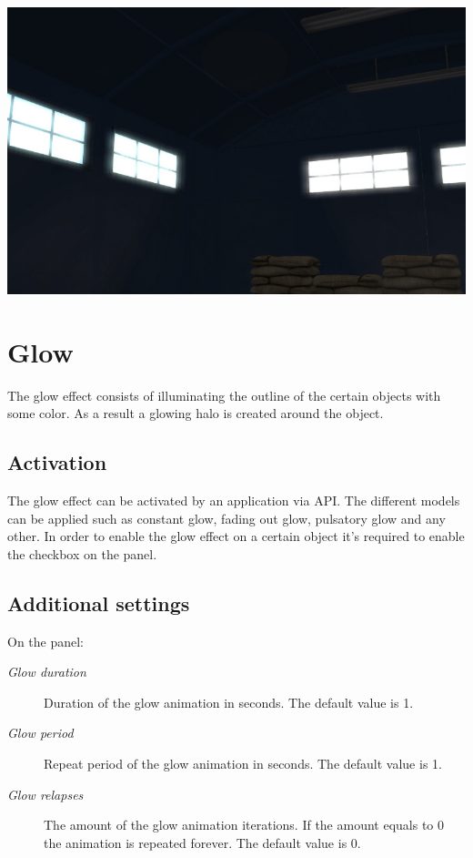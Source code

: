 \documentclass[a4paper,12pt,oneside]{sphinxmanual}
\begin{document}
{\hfill\includegraphics[width=1.000\linewidth]{bloom.jpg}\hfill}

\begin{DUlineblock}{0em}
\item[] 
\end{DUlineblock}


\section{Glow}
\label{postprocessing_effects:index-4}\label{postprocessing_effects:id17}\label{postprocessing_effects:glow}
The glow effect consists of illuminating the outline of the certain objects with some color. As a result a glowing halo is created around the object.


\subsection{Activation}
\label{postprocessing_effects:id18}
The glow effect can be activated by an application via API. The different models can be applied such as constant glow, fading out glow, pulsatory glow and any other. In order to enable the glow effect on a certain object it's required to enable the  checkbox on the  panel.


\subsection{Additional settings}
\label{postprocessing_effects:id19}
On the  panel:
\begin{description}
\item[{\emph{Glow duration}}] \leavevmode
Duration of the glow animation in seconds. The default value is 1.

\item[{\emph{Glow period}}] \leavevmode
Repeat period of the glow animation in seconds. The default value is 1.

\item[{\emph{Glow relapses}}] \leavevmode
The amount of the glow animation iterations. If the amount equals to 0 the animation is repeated forever. The default value is 0.

\end{description}
\end{document}
